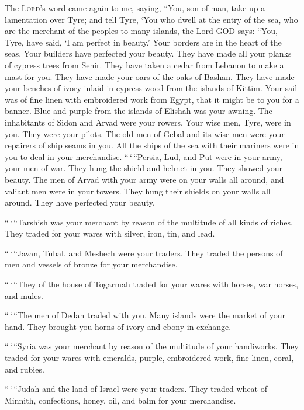  The \textsc{Lord}'s word came again to me, saying,
 ``You, son of man, take up a lamentation over Tyre;
 and tell Tyre, `You who dwell at the entry of the sea,
who are the merchant of the peoples to many islands, the Lord GOD says:
``You, Tyre, have said, `I am perfect in beauty.'  Your
borders are in the heart of the seas. Your builders have perfected your
beauty.  They have made all your planks of cypress trees
from Senir. They have taken a cedar from Lebanon to make a mast for you.
 They have made your oars of the oaks of Bashan. They have
made your benches of ivory inlaid in cypress wood from the islands of
Kittim.  Your sail was of fine linen with embroidered work
from Egypt, that it might be to you for a banner. Blue and purple from
the islands of Elishah was your awning.  The inhabitants
of Sidon and Arvad were your rowers. Your wise men, Tyre, were in you.
They were your pilots.  The old men of Gebal and its wise
men were your repairers of ship seams in you. All the ships of the sea
with their mariners were in you to deal in your merchandise.
 ``\,`\,``Persia, Lud, and Put were in your army, your
men of war. They hung the shield and helmet in you. They showed your
beauty.  The men of Arvad with your army were on your
walls all around, and valiant men were in your towers. They hung their
shields on your walls all around. They have perfected your beauty.

 ``\,`\,``Tarshish was your merchant by reason of the
multitude of all kinds of riches. They traded for your wares with
silver, iron, tin, and lead.

 ``\,`\,``Javan, Tubal, and Meshech were your traders.
They traded the persons of men and vessels of bronze for your
merchandise.

 ``\,`\,``They of the house of Togarmah traded for your
wares with horses, war horses, and mules.

 ``\,`\,``The men of Dedan traded with you. Many islands
were the market of your hand. They brought you horns of ivory and ebony
in exchange.

 ``\,`\,``Syria was your merchant by reason of the
multitude of your handiworks. They traded for your wares with emeralds,
purple, embroidered work, fine linen, coral, and rubies.

 ``\,`\,``Judah and the land of Israel were your traders.
They traded wheat of Minnith, confections, honey, oil, and balm for your
merchandise.


